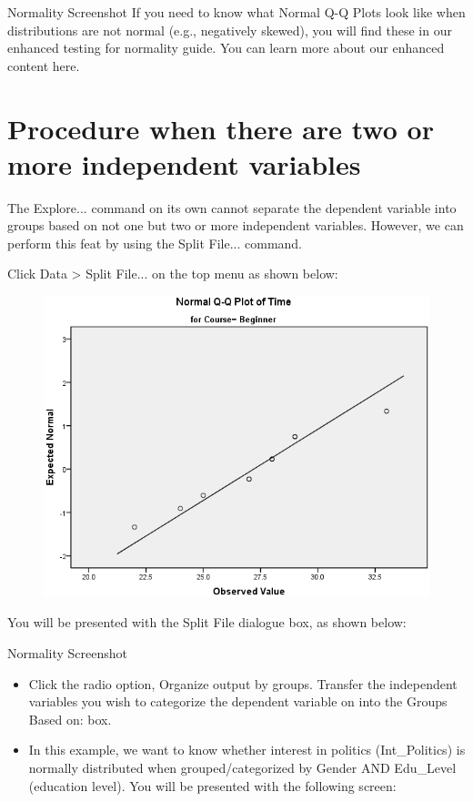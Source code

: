 \documentclass[]{article}
\begin{document}
Normality Screenshot
If you need to know what Normal Q-Q Plots look like when distributions are not normal (e.g., negatively skewed), you will find these in our enhanced testing for normality guide. You can learn more about our enhanced content here.



\newpage
\section{Procedure when there are two or more independent variables}
The Explore... command on its own cannot separate the dependent variable into groups based on not one but two or more independent variables. However, we can perform this feat by using the Split File... command.

Click Data > Split File... on the top menu as shown below:

\begin{figure}
	\centering
	\includegraphics[width=0.7\linewidth]{Normality/normality-8}
	\caption{}
	\label{fig:normality-8}
\end{figure}
You will be presented with the Split File dialogue box, as shown below:

Normality Screenshot
\begin{itemize}
	\item Click the radio option, Organize output by groups. Transfer the independent variables you wish to categorize the dependent variable on into the Groups Based on: box. 
	\item In this example, we want to know whether interest in politics (Int\_Politics) is normally distributed when grouped/categorized by Gender AND Edu\_Level (education level). You will be presented with the following screen:
\end{itemize}
\end{document}
